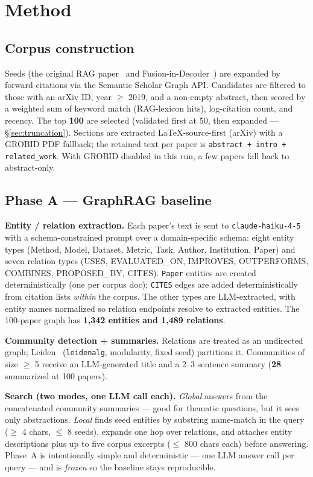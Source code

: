 \documentclass[11pt]{article}
\begin{document}
\section{Method}

\subsection{Corpus construction}
Seeds (the original RAG paper~\citep{lewis2020rag} and Fusion-in-Decoder~\citep{izacard2021fid}) are expanded by forward citations via the Semantic Scholar Graph API. Candidates are filtered to those with an arXiv ID, year $\geq$ 2019, and a non-empty abstract, then scored by a weighted sum of keyword match (RAG-lexicon hits), log-citation count, and recency. The top \textbf{100} are selected (validated first at 50, then expanded --- \S\ref{sec:truncation}). Sections are extracted LaTeX-source-first (arXiv) with a GROBID PDF fallback; the retained text per paper is \texttt{abstract + intro + related\_work}. With GROBID disabled in this run, a few papers fall back to abstract-only.

\subsection{Phase A --- GraphRAG baseline}
\textbf{Entity / relation extraction.} Each paper's text is sent to \texttt{claude-haiku-4-5} with a schema-constrained prompt over a domain-specific schema: eight entity types (Method, Model, Dataset, Metric, Task, Author, Institution, Paper) and seven relation types (USES, EVALUATED\_ON, IMPROVES, OUTPERFORMS, COMBINES, PROPOSED\_BY, CITES). \texttt{Paper} entities are created deterministically (one per corpus doc); \texttt{CITES} edges are added deterministically from citation lists \emph{within} the corpus. The other types are LLM-extracted, with entity names normalized so relation endpoints resolve to extracted entities. The 100-paper graph has \textbf{1{,}342 entities and 1{,}489 relations}.

\textbf{Community detection + summaries.} Relations are treated as an undirected graph; Leiden~\citep{traag2019leiden} (\texttt{leidenalg}, modularity, fixed seed) partitions it. Communities of size $\geq$ 5 receive an LLM-generated title and a 2--3 sentence summary (\textbf{28} summarized at 100 papers).

\textbf{Search (two modes, one LLM call each).} \emph{Global} answers from the concatenated community summaries --- good for thematic questions, but it sees only abstractions. \emph{Local} finds seed entities by substring name-match in the query ($\geq$ 4 chars, $\leq$ 8 seeds), expands one hop over relations, and attaches entity descriptions plus up to five corpus excerpts ($\leq$ 800 chars each) before answering. Phase~A is intentionally simple and deterministic --- one LLM answer call per query --- and is \emph{frozen} so the baseline stays reproducible.
\end{document}
